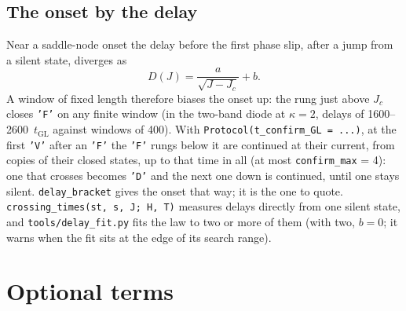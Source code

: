 \documentclass[11pt,a4paper]{article}
\newcommand{\tGL}{t_{\mathrm{GL}}}
\newcommand{\code}[1]{\texttt{#1}}
\begin{document}
\subsection{The onset by the delay}\label{sec:delay}

Near a saddle-node onset the delay before the first phase slip, after a jump from a silent state, diverges as
\begin{equation}
  D(J) = \frac{a}{\sqrt{J - J_c}} + b .
\end{equation}
A window of fixed length therefore biases the onset up: the rung just above $J_c$ closes \code{'F'} on any finite window (in
the two-band diode at $\kappa = 2$, delays of 1600--2600~$\tGL$ against windows of 400). With
\code{Protocol(t\_confirm\_GL = ...)}, at the first \code{'V'} after an \code{'F'} the \code{'F'} rungs below it are continued at their
current, from copies of their closed states, up to that time in all (at most \code{confirm\_max} = 4): one that crosses
becomes \code{'D'} and the next one down is continued, until one stays silent. \code{delay\_bracket} gives the onset that way;
it is the one to quote. \code{crossing\_times(st, s, J; H, T)} measures delays directly from one silent state, and
\code{tools/delay\_fit.py} fits the law to two or more of them (with two, $b = 0$; it warns when the fit sits at the edge
of its search range).

\section{Optional terms}
\end{document}
